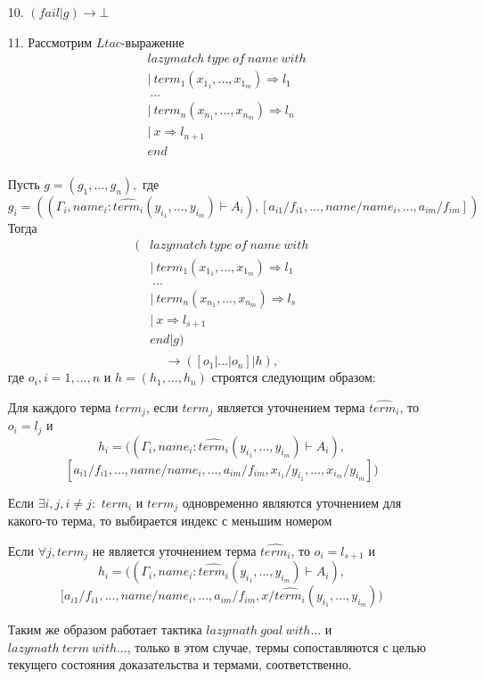 \documentclass[12pt]{article}
\begin{document}
\begin{enumerate}
    \item[10.] $(fail|g) \xrightarrow{} \bot $
    \item[11.] Рассмотрим $Ltac$-выражение 
    \begin{align*}
    & lazymatch\ type\ of\ name\ with \\
    & |\ term_1 (x_{1_1}, ..., x_{1_m}) \Rightarrow l_1\\
    & \ ... \\
    & |\ term_n (x_{n_1}, ..., x_{n_m}) \Rightarrow l_n \\
    & |\ x \Rightarrow l_{n+1} \\
    & end \\
    \end{align*}
    
    Пусть $g=(g_1,...,g_n),$ где $$g_i=((\Gamma_i, name_i: \hat{term_i}(y_{i_1}, ..., y_{i_m}) \vdash A_i), [a_{i1}/f_{i1},..., name/name_i,...,a_{im}/f_{im}])$$
    Тогда 
    \begin{align*}(
    & lazymatch\ type\ of\ name\ with \\
    & |\ term_1(x_{1_1}, ..., x_{1_m}) \Rightarrow l_1\\
    & \ ... \\
    & |\ term_n(x_{n_1}, ..., x_{n_m}) \Rightarrow l_s \\
    & |\ x \Rightarrow l_{s+1} \\
    & end | g)\\
    \end{align*}
    $$\xrightarrow{} ([o_1|...| o_{n}]|h),$$ где $o_i, i=1,...,n$ и $h=(h_1,...,h_n)$ строятся следующим образом:
    \item[] Для каждого терма $term_{j}$, если $term_{j}$ является уточнением терма $\hat{term_{i}}$, то $o_i=l_j$ и 
    $$h_i=((\Gamma_i, name_i: \hat{term_i}(y_{i_1}, ..., y_{i_m}) \vdash A_i),$$ $$ [a_{i1}/f_{i1},..., name/name_i,...,a_{im}/f_{im}, x_{i_1}/y_{i_1},..., x_{i_m}/y_{i_m}])$$
    \item[] Если $\exists i,j, i \neq j:$ $term_i$ и $term_j$ одновременно являются уточнением для какого-то терма, то выбирается индекс с меньшим номером
    \item[] Если $\forall j, term_j$ не является уточнением терма $\hat{term_i}$, то $o_i=l_{s+1}$ и $$h_i=((\Gamma_i, name_i: \hat{term_i}(y_{i_1}, ..., y_{i_m}) \vdash A_i),$$ $$ [a_{i1}/f_{i1},..., name/name_i,...,a_{im}/f_{im}, x/\hat{term_i}(y_{i_1}, ..., y_{i_m}))$$

    Таким же образом работает тактика $lazymath\ goal\ with...$ и $lazymath\ term\ with...$, только в этом случае, термы сопоставляются с целью текущего состояния доказательства и термами, соответственно. 
    
\end{enumerate}
\end{document}
